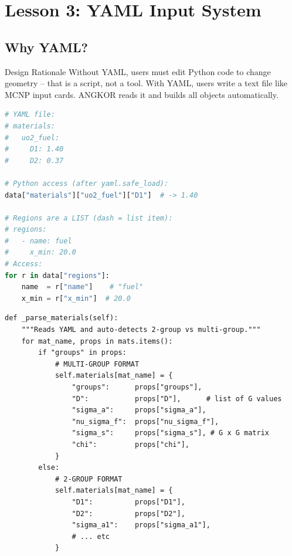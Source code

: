 \documentclass[12pt,a4paper]{article}
\begin{document}
\section{Lesson 3: YAML Input System}

\subsection{Why YAML?}

\begin{lessonbox}{Design Rationale}
Without YAML, users must edit Python code to change geometry -- that is a script,
not a tool. With YAML, users write a text file like MCNP input cards.
ANGKOR reads it and builds all objects automatically.
\end{lessonbox}

\begin{lstlisting}[language=Python, caption={How YAML Maps to Python Objects}]
# YAML file:
# materials:
#   uo2_fuel:
#     D1: 1.40
#     D2: 0.37

# Python access (after yaml.safe_load):
data["materials"]["uo2_fuel"]["D1"]  # -> 1.40

# Regions are a LIST (dash = list item):
# regions:
#   - name: fuel
#     x_min: 20.0
# Access:
for r in data["regions"]:
    name  = r["name"]    # "fuel"
    x_min = r["x_min"]  # 20.0
\end{lstlisting}

\begin{lstlisting}[caption={Auto-Detection of XS Format}]
def _parse_materials(self):
    """Reads YAML and auto-detects 2-group vs multi-group."""
    for mat_name, props in mats.items():
        if "groups" in props:
            # MULTI-GROUP FORMAT
            self.materials[mat_name] = {
                "groups":      props["groups"],
                "D":           props["D"],      # list of G values
                "sigma_a":     props["sigma_a"],
                "nu_sigma_f":  props["nu_sigma_f"],
                "sigma_s":     props["sigma_s"], # G x G matrix
                "chi":         props["chi"],
            }
        else:
            # 2-GROUP FORMAT
            self.materials[mat_name] = {
                "D1":          props["D1"],
                "D2":          props["D2"],
                "sigma_a1":    props["sigma_a1"],
                # ... etc
            }
\end{lstlisting}
\end{document}

